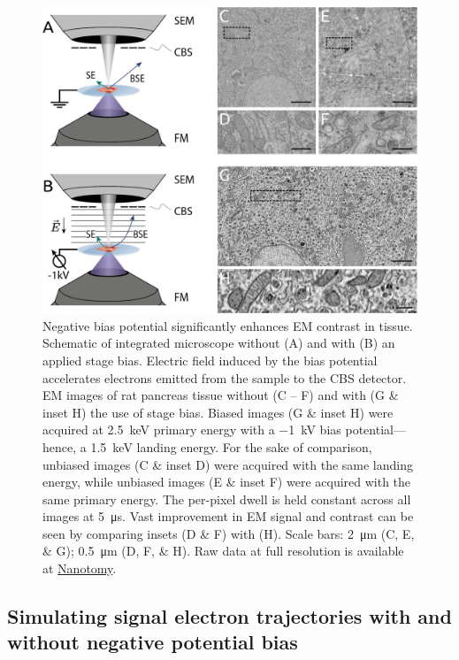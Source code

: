 \begin{figure}[!tb]
    \centering
    \includegraphics[width=\linewidth]{chapter-2/figures_JPEG_HQ/fig2-1_setup.jpg}
    \caption{Negative bias potential significantly enhances EM contrast in tissue. Schematic of integrated microscope without (A) and with (B) an applied stage bias. Electric field induced by the bias potential accelerates electrons emitted from the sample to the CBS detector. EM images of rat pancreas tissue without (C -- F) and with (G \& inset H) the use of stage bias. Biased images (G \& inset H) were acquired at \SI{2.5}{\kilo\electronvolt} primary energy with a \SI{-1}{\kilo\volt} bias potential---hence, a \SI{1.5}{\kilo\electronvolt} landing energy. For the sake of comparison, unbiased images (C \& inset D) were acquired with the same landing energy, while unbiased images (E \& inset F) were acquired with the same primary energy. The per-pixel dwell is held constant across all images at \SI{5}{\micro\second}. Vast improvement in EM signal and contrast can be seen by comparing insets (D \& F) with (H). Scale bars: \SI{2}{\micro\meter} (C, E, \& G); \SI{0.5}{\micro\meter} (D, F, \& H). Raw data at full resolution is available at \href{www.nanotomy.org}{Nanotomy}.}
    \label{fig:2.1_setup}
\end{figure}


\subsection{Simulating signal electron trajectories with and without negative potential bias}

